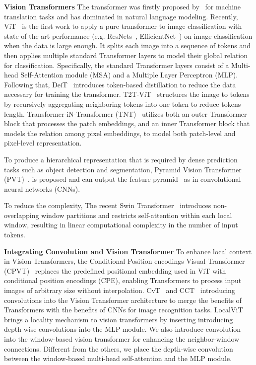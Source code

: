 \documentclass{article}
\begin{document}
\noindent\textbf{Vision Transformers}
The transformer was firstly proposed by~\cite{vaswani2017attention} for machine translation tasks and has dominated in natural language modeling. Recently, ViT~\cite{dosovitskiy2020image} is the first work to apply a pure transformer to image classification with state-of-the-art performance (e.g. ResNets~\cite{he2016deep}, EfficientNet~\cite{tan2019efficientnet}) on image classification when the data is large enough. It splits each image into a sequence of tokens and then applies multiple standard Transformer layers to model their global relation for classification. Specifically, the standard Transformer layers consist of a Multi-head Self-Attention module (MSA) and a Multiple Layer Perceptron (MLP). Following that, DeiT~\cite{touvron2020deit} introduces token-based distillation to reduce the data necessary for training the transformer. T2T-ViT~\cite{yuan2021tokens} structures the image to tokens by recursively aggregating neighboring tokens into one token to reduce tokens length. Transformer-iN-Transformer (TNT)~\cite{han2021transformer} utilizes both an outer Transformer block that processes the patch embeddings, and an inner Transformer block that models the relation among pixel embeddings, to model both patch-level and pixel-level representation.

To produce a hierarchical representation that is required by dense prediction tasks such as object detection and segmentation, Pyramid Vision Transformer (PVT)~\cite{wang2021pyramid}, is proposed and can output the feature pyramid~\cite{lin2017feature} as in convolutional neural networks (CNNs). 

To reduce the complexity, The recent Swin Transformer~\cite{liu2021Swin} introduces non-overlapping window partitions and restricts self-attention within each local window, resulting in linear computational complexity in the number of input tokens.

\noindent\textbf{Integrating Convolution and Vision Transformer}
To enhance local context in Vision Transformers, the Conditional Position encodings Visual Transformer (CPVT)~\cite{chu2021conditional} replaces the predefined positional embedding used in ViT with conditional
position encodings (CPE), enabling Transformers to process input images of arbitrary size without interpolation. CvT~\cite{wu2021cvt} and CCT~\cite{hassani2021escaping} introducing convolutions into the Vision Transformer architecture to merge the benefits of Transformers with the benefits of CNNs for image recognition tasks. LocalViT~\cite{li2021localvit} brings a locality mechanism to vision transformers by inserting introducing depth-wise convolutions into the MLP module. We also introduce convolution into the window-based vision transformer for enhancing the neighbor-window connections. Different from the others, we place the depth-wise convolution between the window-based multi-head self-attention and the MLP module.
\end{document}
